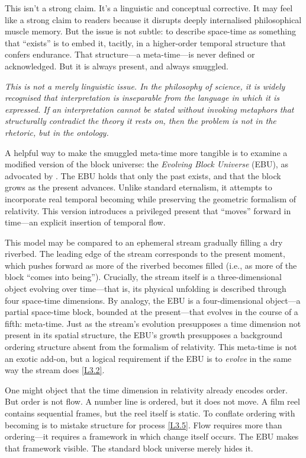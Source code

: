\documentclass[12pt]{book}
\newcounter{logicanchor}
\newenvironment{logicanchorenv}[1]{\refstepcounter{logicanchor}\label{#1}}{}
\newcommand{\logiclink}[2]{\begin{logicanchorenv}{logic:#1}\end{logicanchorenv}\hyperref[appendix:#1]{[#1]}\xspace}
\begin{document}
This isn't a strong claim. It's a linguistic and conceptual corrective. It may feel like a strong claim to readers because it disrupts deeply internalised philosophical muscle memory. But the issue is not subtle: to describe space-time as something that ``exists'' is to embed it, tacitly, in a higher-order temporal structure that confers endurance. That structure---a meta-time---is never defined or acknowledged. But it is always present, and always smuggled.

\textit{This is not a merely linguistic issue. In the philosophy of science, it is widely recognised that interpretation is inseparable from the language in which it is expressed. If an interpretation cannot be stated without invoking metaphors that structurally contradict the theory it rests on, then the problem is not in the rhetoric, but in the ontology.}

A helpful way to make the smuggled meta-time more tangible is to examine a modified version of the block universe: the \textit{Evolving Block Universe} (EBU), as advocated by \citet{ellis2006,ellis2014}. The EBU holds that only the past exists, and that the block grows as the present advances. Unlike standard eternalism, it attempts to incorporate real temporal becoming while preserving the geometric formalism of relativity. This version introduces a privileged present that ``moves'' forward in time---an explicit insertion of temporal flow.

This model may be compared to an ephemeral stream gradually filling a dry riverbed. The leading edge of the stream corresponds to the present moment, which pushes forward as more of the riverbed becomes filled (i.e., as more of the block ``comes into being''). Crucially, the stream itself is a three-dimensional object evolving over time---that is, its physical unfolding is described through four space-time dimensions. By analogy, the EBU is a four-dimensional object---a partial space-time block, bounded at the present---that evolves in the course of a fifth: meta-time. Just as the stream's evolution presupposes a time dimension not present in its spatial structure, the EBU's growth presupposes a background ordering structure absent from the formalism of relativity. This meta-time is not an exotic add-on, but a logical requirement if the EBU is to \textit{evolve} in the same way the stream does \logiclink{L3.2}{}.

One might object that the time dimension in relativity already encodes order. But order is not flow. A number line is ordered, but it does not move. A film reel contains sequential frames, but the reel itself is static. To conflate ordering with becoming is to mistake structure for process \logiclink{L3.5}{}. Flow requires more than ordering---it requires a framework in which change itself occurs. The EBU makes that framework visible. The standard block universe merely hides it.
\end{document}
